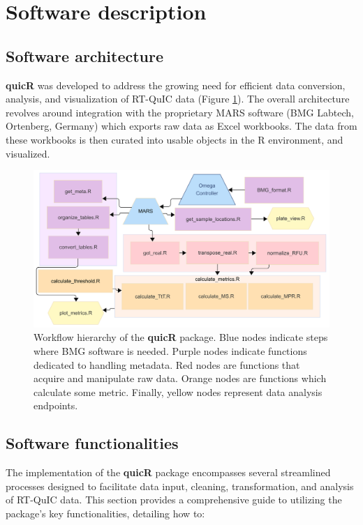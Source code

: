 \documentclass[preprint,12pt,a4paper]{elsarticle}
\begin{document}
    \section{Software description}
        \subsection{Software architecture}
            \textbf{quicR} was developed to address the growing need for efficient data conversion, analysis, and visualization of RT-QuIC data (Figure \ref{fig:workflow}). The overall architecture revolves around integration with the proprietary MARS software (BMG Labtech, Ortenberg, Germany) which exports raw data as Excel workbooks. The data from these workbooks is then curated into usable objects in the R environment, and visualized.

            \begin{figure}[ht]
                \centering
                \includegraphics[width=\textwidth]{images/workflow.png}
                \caption{Workflow hierarchy of the \textbf{quicR} package. Blue nodes indicate steps where BMG software is needed. Purple nodes indicate functions dedicated to handling metadata. Red nodes are functions that acquire and manipulate raw data. Orange nodes are functions which calculate some metric. Finally, yellow nodes represent data analysis endpoints.}
                \label{fig:workflow}
            \end{figure}

    \subsection{Software functionalities}
        The implementation of the \textbf{quicR} package encompasses several streamlined processes designed to facilitate data input, cleaning, transformation, and analysis of RT-QuIC data. This section provides a comprehensive guide to utilizing the package's key functionalities, detailing how to:
            
\end{document}
